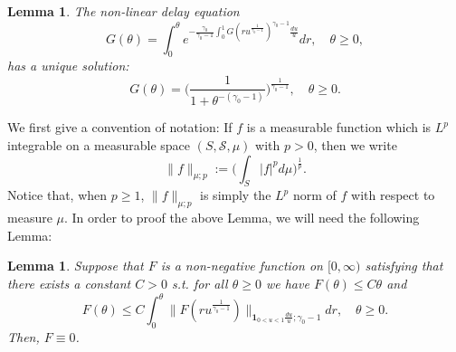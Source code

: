 \documentclass[12pt, a4paper]{amsart}
\newtheorem{lem}[thm]{Lemma}
\theoremstyle{definition}
\numberwithin{equation}{section}
\begin{document}
\begin{lem}
\label{lem: characterize the general Mittag-Leffler distribution}
	The non-linear delay equation
\[\label{eq: equation for the distribution}
	G( \theta)
	= \int_0^\theta e^{ - \frac{\gamma_0} {\gamma_0 - 1} \int_0^1 G(ru^{\frac{1}{\gamma_0 - 1} })^{\gamma_0 - 1}\frac{du}{u} } dr,
	\quad \theta \geq 0,
\]
	has a unique solution:
\[\label{eq: solution for the equation}
	G(\theta)
	= \big(\frac{1}{1+\theta^{-(\gamma_0 - 1)}}\big)^{\frac{1}{\gamma_0 - 1}},
	\quad \theta \geq 0.
\]
\end{lem}

	We first give a convention of notation:
	If $f$ is a measurable function which is $L^p$ integrable on a measurable space $(S,\mathscr S,\mu)$ with $p > 0$, then we write
\[
	\|f\|_{\mu;p} := \Big(\int_{S} |f|^p d\mu \Big)^{\frac{1}{p}}.
\]
	Notice that, when $p\geq 1$, $\|f\|_{\mu;p}$ is simply the $L^p$ norm of $f$ with respect to measure $\mu$.	
	In order to proof the above Lemma, we will need the following Lemma:

\begin{lem}\label{lem: F is zero}
	Suppose that $F$ is a non-negative function on $[0,\infty)$ satisfying that there exists a constant $C>0$ s.t. for all $\theta \geq 0$ we have $F(\theta) \leq C\theta$ and
\[
	F(\theta)
	\leq C \int_0^\theta \|  F(ru^{ \frac{1}{\gamma_0- 1}  })\|_{\mathbf 1_{0<u<1}\frac{du}{u}; \gamma_0 - 1} dr, \quad \theta \geq 0.
\]
	Then, $F \equiv 0$.
\end{lem}
	
\end{document}
